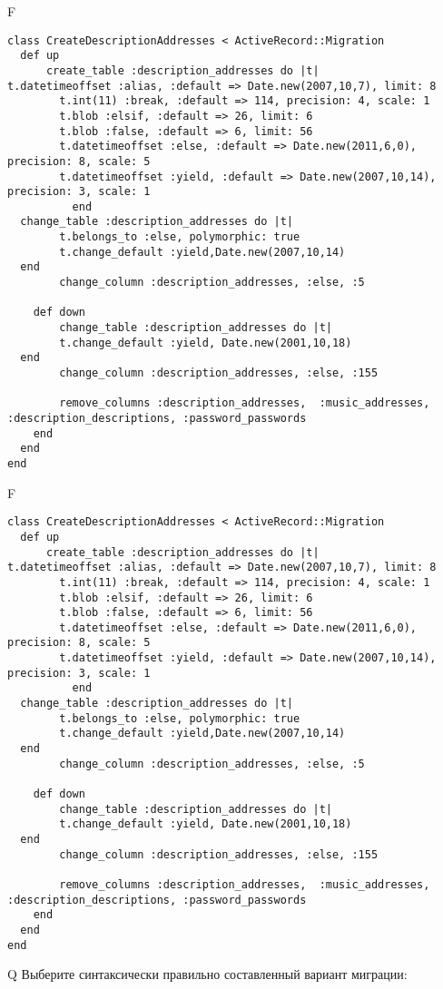 F
\begin{verbatim}
class CreateDescriptionAddresses < ActiveRecord::Migration
  def up
	  create_table :description_addresses do |t|
t.datetimeoffset :alias, :default => Date.new(2007,10,7), limit: 8
		t.int(11) :break, :default => 114, precision: 4, scale: 1
		t.blob :elsif, :default => 26, limit: 6
		t.blob :false, :default => 6, limit: 56
		t.datetimeoffset :else, :default => Date.new(2011,6,0), precision: 8, scale: 5
		t.datetimeoffset :yield, :default => Date.new(2007,10,14), precision: 3, scale: 1
		  end
  change_table :description_addresses do |t|
		t.belongs_to :else, polymorphic: true
 		t.change_default :yield,Date.new(2007,10,14)
  end
 		change_column :description_addresses, :else, :5
   
	def down
		change_table :description_addresses do |t|
		t.change_default :yield, Date.new(2001,10,18)
  end
 		change_column :description_addresses, :else, :155
   
		remove_columns :description_addresses,  :music_addresses, :description_descriptions, :password_passwords 
    end 
  end
end

\end{verbatim}

F
\begin{verbatim}
class CreateDescriptionAddresses < ActiveRecord::Migration
  def up
	  create_table :description_addresses do |t|
t.datetimeoffset :alias, :default => Date.new(2007,10,7), limit: 8
		t.int(11) :break, :default => 114, precision: 4, scale: 1
		t.blob :elsif, :default => 26, limit: 6
		t.blob :false, :default => 6, limit: 56
		t.datetimeoffset :else, :default => Date.new(2011,6,0), precision: 8, scale: 5
		t.datetimeoffset :yield, :default => Date.new(2007,10,14), precision: 3, scale: 1
		  end
  change_table :description_addresses do |t|
		t.belongs_to :else, polymorphic: true
 		t.change_default :yield,Date.new(2007,10,14)
  end
 		change_column :description_addresses, :else, :5
   
	def down
		change_table :description_addresses do |t|
		t.change_default :yield, Date.new(2001,10,18)
  end
 		change_column :description_addresses, :else, :155
   
		remove_columns :description_addresses,  :music_addresses, :description_descriptions, :password_passwords 
    end 
  end
end

\end{verbatim}

Q
Выберите синтаксически правильно составленный вариант миграции:

